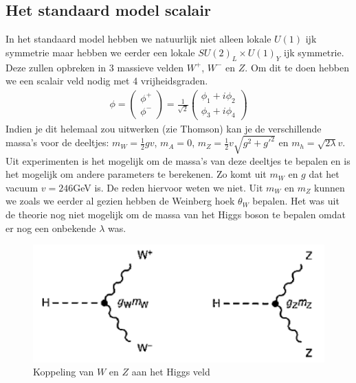 \documentclass[../main.tex]{subfiles}
\begin{document}
\subsection{Het standaard model scalair}%
\label{sub:het_standaard_model_scalair}

In het standaard model hebben we natuurlijk niet alleen lokale $U(1)$ ijk symmetrie maar hebben we eerder een lokale $SU(2)_L\times U(1)_Y$ ijk symmetrie. Deze zullen opbreken in 3 massieve velden $W^+$, $W^-$ en $Z$. Om dit te doen hebben we een scalair veld nodig met 4 vrijheidsgraden.
\begin{equation}
    \begin{aligned}
        \label{eq:sm_scalair_veld}
        \phi = 
        \begin{pmatrix}
            \phi^+\\
            \phi^-
        \end{pmatrix}
        = \frac{1}{\sqrt{2}} 
        \begin{pmatrix}
            \phi_1 + i\phi_2\\
            \phi_3 + i\phi_4
        \end{pmatrix}
    \end{aligned}
\end{equation}
Indien je dit helemaal zou uitwerken (zie Thomson) kan je de verschillende massa's voor de deeltjes: $m_W = \frac{1}{2} gv$, $m_A = 0$, $m_Z = \frac{1}{2} v\sqrt{g^2+g'^2}$ en $m_h = \sqrt{2\lambda}v$. Uit experimenten is het mogelijk om de massa's van deze deeltjes te bepalen en is het mogelijk om andere parameters te berekenen. Zo komt uit $m_W$ en $g$ dat het vacuum $v=246$GeV is. De reden hiervoor weten we niet. Uit $m_W$ en $m_Z$ kunnen we zoals we eerder al gezien hebben de Weinberg hoek $\theta_W$ bepalen. Het was uit de theorie nog niet mogelijk om de massa van het Higgs boson te bepalen omdat er nog een onbekende $\lambda$ was.

\begin{figure}[h]
    \centering
    \includegraphics[width=0.6\linewidth]{higgs_boson/koppeling_higgs_wz_boson.png}
    \caption{Koppeling van $W$ en $Z$ aan het Higgs veld}%
    \label{fig:higgs_boson/koppeling_higgs_wz_boson}
\end{figure}
\end{document}
